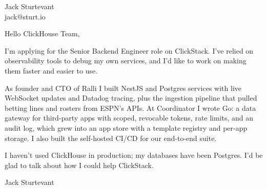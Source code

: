 \documentclass[11pt]{article}
\begin{document}
\raggedright

{\namefont\fontsize{20pt}{24pt}\selectfont Jack Sturtevant}\\[-0.3em]
jack@sturt.io

\vspace{1.2em}

Hello ClickHouse Team,

I'm applying for the Senior Backend Engineer role on ClickStack. I've relied on observability tools to debug my own services, and I'd like to work on making them faster and easier to use.

As founder and CTO of Ralli I built NestJS and Postgres services with live WebSocket updates and Datadog tracing, plus the ingestion pipeline that pulled betting lines and rosters from ESPN's APIs. At Coordinator I wrote Go: a data gateway for third-party apps with scoped, revocable tokens, rate limits, and an audit log, which grew into an app store with a template registry and per-app storage. I also built the self-hosted CI/CD for our end-to-end suite.

I haven't used ClickHouse in production; my databases have been Postgres. I'd be glad to talk about how I could help ClickStack.

\vspace{0.6em}
Jack Sturtevant
\end{document}
